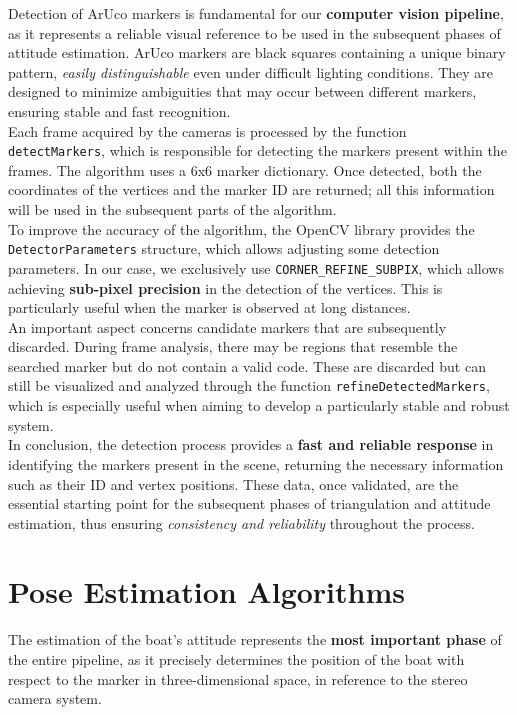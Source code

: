 Detection of ArUco markers is fundamental for our \textbf{computer vision pipeline}, as it represents a reliable visual reference to be used in the subsequent phases of attitude estimation. ArUco markers are black squares containing a unique binary pattern, \textit{easily distinguishable} even under difficult lighting conditions. They are designed to minimize ambiguities that may occur between different markers, ensuring stable and fast recognition.
\\Each frame acquired by the cameras is processed by the function\\ \texttt{detectMarkers}, which is responsible for detecting the markers present within the frames. The algorithm uses a 6x6 marker dictionary. Once detected, both the coordinates of the vertices and the marker ID are returned; all this information will be used in the subsequent parts of the algorithm.
\\To improve the accuracy of the algorithm, the OpenCV library provides the \texttt{DetectorParameters} structure, which allows adjusting some detection parameters. In our case, we exclusively use \texttt{CORNER\_REFINE\_SUBPIX}, which allows achieving \textbf{sub-pixel precision} in the detection of the vertices. This is particularly useful when the marker is observed at long distances.
\\An important aspect concerns candidate markers that are subsequently discarded. During frame analysis, there may be regions that resemble the searched marker but do not contain a valid code. These are discarded but can still be visualized and analyzed through the function \texttt{refineDetectedMarkers}, which is especially useful when aiming to develop a particularly stable and robust system.
\\In conclusion, the detection process provides a \textbf{fast and reliable response} in identifying the markers present in the scene, returning the necessary information such as their ID and vertex positions. These data, once validated, are the essential starting point for the subsequent phases of triangulation and attitude estimation, thus ensuring \textit{consistency and reliability} throughout the process.

\section{Pose Estimation Algorithms}

The estimation of the boat’s attitude represents the \textbf{most important phase} of the entire pipeline, as it precisely determines the position of the boat with respect to the marker in three-dimensional space, in reference to the stereo camera system.  

